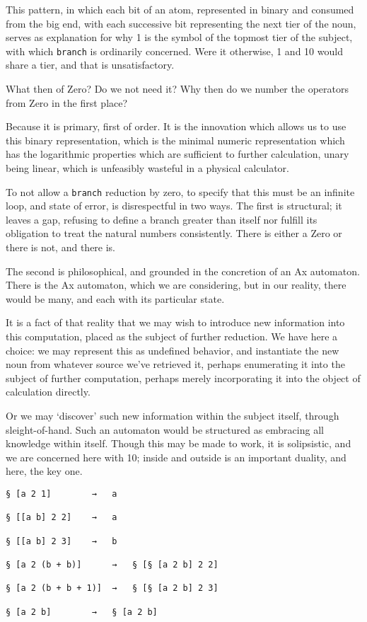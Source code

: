\documentclass[twoside]{article}
\begin{document}
This pattern, in which each bit of an atom, represented in binary and consumed from the big end, with each successive bit representing the next tier of the noun, serves as explanation for why 1 is the symbol of the topmost tier of the subject, with which \texttt{branch} is ordinarily concerned. Were it otherwise, 1 and 10 would share a tier, and that is unsatisfactory.

What then of Zero? Do we not need it? Why then do we number the operators from Zero in the first place?

Because it is primary, first of order. It is the innovation which allows us to use this binary representation, which is the minimal numeric representation which has the logarithmic properties which are sufficient to further calculation, unary being linear, which is unfeasibly wasteful in a physical calculator.

To not allow a \texttt{branch} reduction by zero, to specify that this must be an infinite loop, and state of error, is disrespectful in two ways. The first is structural; it leaves a gap, refusing to define a branch greater than itself nor fulfill its obligation to treat the natural numbers consistently. There is either a Zero or there is not, and there is.

The second is philosophical, and grounded in the concretion of an Ax automaton. There is the Ax automaton, which we are considering, but in our reality, there would be many, and each with its particular state.

It is a fact of that reality that we may wish to introduce new information into this computation, placed as the subject of further reduction. We have here a choice: we may represent this as undefined behavior, and instantiate the new noun from whatever source we've retrieved it, perhaps enumerating it into the subject of further computation, perhaps merely incorporating it into the object of calculation directly.

Or we may `discover' such new information within the subject itself, through sleight-of-hand. Such an automaton would be structured as embracing all knowledge within itself. Though this may be made to work, it is solipsistic, and we are concerned here with 10; inside and outside is an important duality, and here, the key one.

\begin{lstlisting}[style=listingblock]
§ [a 2 1]        →   a

§ [[a b] 2 2]    →   a

§ [[a b] 2 3]    →   b

§ [a 2 (b + b)]      →   § [§ [a 2 b] 2 2]

§ [a 2 (b + b + 1)]  →   § [§ [a 2 b] 2 3]

§ [a 2 b]        →   § [a 2 b]
\end{lstlisting}
\end{document}
